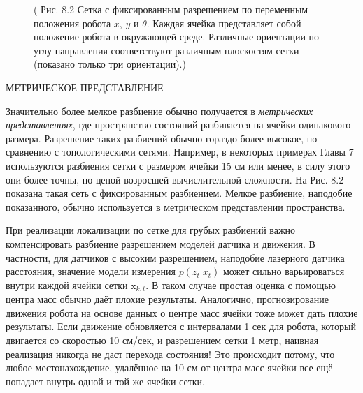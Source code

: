 \documentclass[10pt,a4paper]{article}
\begin{document}
\begin{figure}[H]
	\caption{ (  Рис. 8.2 Сетка с фиксированным разрешением по переменным положения робота $x$,  $y$ и $\theta$. Каждая ячейка представляет собой положение робота в окружающей среде. Различные ориентации по углу направления соответствуют различным плоскостям сетки (показано только три ориентации).)}
	\label{fig:82orig}
\end{figure}

МЕТРИЧЕСКОЕ 
ПРЕДСТАВЛЕНИЕ

Значительно более мелкое разбиение обычно получается в \textit{метрических представлениях}, где пространство состояний разбивается на ячейки одинакового размера. Разрешение таких разбиений обычно гораздо более высокое, по сравнению с топологическими сетями. Например, в некоторых примерах Главы 7 используются разбиения сетки с размером ячейки 15 см или менее, в силу этого они более точны, но ценой возросшей вычислительной сложности. На Рис. 8.2 показана такая сеть с фиксированным разбиением. Мелкое разбиение, наподобие показанного, обычно используется в метрическом представлении пространства. 

При реализации локализации по сетке для грубых разбиений важно компенсировать разбиение разрешением моделей датчика и движения. В частности, для датчиков с высоким разрешением, наподобие лазерного датчика расстояния, значение модели измерения $p(z_t|x_t)$ может сильно варьироваться внутри каждой ячейки сетки $\text{x}_{k,t}$. В таком случае простая оценка с помощью центра масс обычно даёт плохие результаты. Аналогично, прогнозирование движения робота на основе данных о центре масс ячейки тоже может дать плохие результаты. Если движение обновляется с интервалами 1 сек для робота, который двигается со скоростью 10 см/сек, и разрешением сетки 1 метр, наивная реализация никогда не даст перехода состояния! Это происходит потому, что любое местонахождение, удалённое на 10 см от центра масс ячейки все ещё попадает внутрь одной и той же ячейки сетки. 
\end{document}
